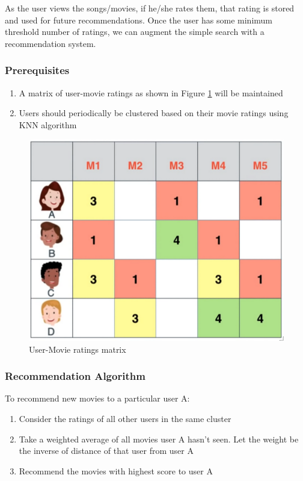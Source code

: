 As the user views the songs/movies, if he/she rates them, that rating is stored and used for future recommendations. Once the user has some minimum threshold number of ratings, we can augment the simple search with a recommendation system.

\subsubsection{Prerequisites}
\begin{enumerate}
	\item A matrix of user-movie ratings as shown in Figure \ref{fig: user movie ratings} will be maintained
	\item Users should periodically be clustered based on their movie ratings using KNN algorithm
\end{enumerate}

\begin{figure}[H]
\centering
\includegraphics[scale=0.5]{imgs/user-movie ratings.png}
\caption{User-Movie ratings matrix}
\label{fig: user movie ratings}
\end{figure}

\subsubsection{Recommendation Algorithm}
To recommend new movies to a particular user A:
\begin{enumerate}
	\item Consider the ratings of all other users in the same cluster
	\item Take a weighted average of all movies user A hasn’t seen. Let the weight be the inverse of distance of that user from user A
	\item Recommend the movies with highest score to user A
\end{enumerate}

